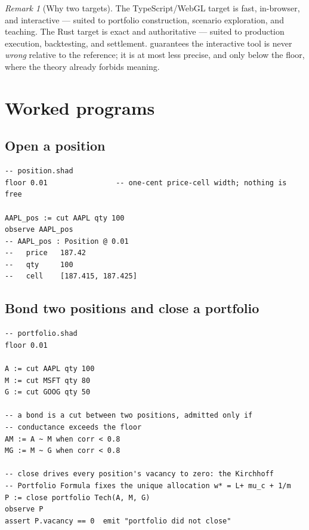 \documentclass[11pt,a4paper]{article}
\theoremstyle{thmstyle}
\theoremstyle{definition}
\theoremstyle{remark}
\newtheorem{remark}[theorem]{Remark}
\begin{document}
\begin{remark}[Why two targets]
\label{rem:two-targets}
The TypeScript/WebGL target is fast, in-browser, and interactive ---
suited to portfolio construction, scenario exploration, and teaching.
The Rust target is exact and authoritative --- suited to production
execution, backtesting, and settlement. 
guarantees the interactive tool is never \emph{wrong} relative to the
reference; it is at most less precise, and only below the floor, where
the theory already forbids meaning.
\end{remark}

\section{Worked programs}
\label{sec:examples}

\subsection{Open a position}

\begin{lstlisting}[caption={Individuating a position (a length-one cut).}]
-- position.shad
floor 0.01                -- one-cent price-cell width; nothing is free

AAPL_pos := cut AAPL qty 100
observe AAPL_pos
-- AAPL_pos : Position @ 0.01
--   price   187.42
--   qty     100
--   cell    [187.415, 187.425]
\end{lstlisting}

\subsection{Bond two positions and close a portfolio}

\begin{lstlisting}[caption={Three-asset portfolio: bonds, then closure to Kirchhoff equilibrium.}]
-- portfolio.shad
floor 0.01

A := cut AAPL qty 100
M := cut MSFT qty 80
G := cut GOOG qty 50

-- a bond is a cut between two positions, admitted only if
-- conductance exceeds the floor
AM := A ~ M when corr < 0.8
MG := M ~ G when corr < 0.8

-- close drives every position's vacancy to zero: the Kirchhoff
-- Portfolio Formula fixes the unique allocation w* = L+ mu_c + 1/m
P := close portfolio Tech(A, M, G)
observe P
assert P.vacancy == 0  emit "portfolio did not close"
\end{lstlisting}
\end{document}
